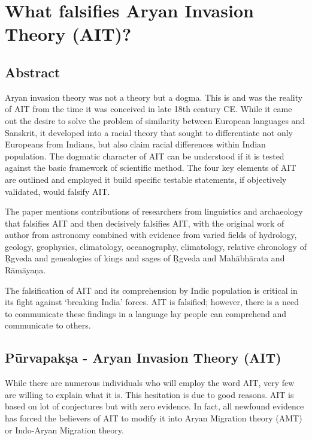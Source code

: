 
\chapter{What falsifies Aryan Invasion Theory (AIT)?}\label{chap08}



\section*{Abstract}

Aryan invasion theory was not a theory but a dogma. This is and was the reality of AIT from the time it was conceived in late 18th century CE. While it came out the desire to solve the problem of similarity between European languages and Sanskrit, it developed into a racial theory that sought to differentiate not only Europeans from Indians, but also claim racial differences within Indian population. The dogmatic character of AIT can be understood if it is tested against the basic framework of scientific method. The four key elements of AIT are outlined and employed it build specific testable statements, if objectively validated, would falsify AIT.

The paper mentions contributions of researchers from linguistics and archaeology that falsifies AIT and then decisively falsifies AIT, with the original work of author from astronomy combined with evidence from varied fields of hydrology, geology, geophysics, climatology, oceanography, climatology, relative chronology of Ṛgveda and genealogies of kings and sages of Ṛgveda and Mahābhārata and Rāmāyaņa.

The falsification of AIT and its comprehension by Indic population is critical in its fight against ‘breaking India’ forces. AIT is falsified; however, there is a need to communicate these findings in a language lay people can comprehend and communicate to others.


\section*{Pūrvapakṣa - Aryan Invasion Theory (AIT)}

While there are numerous individuals who will employ the word AIT, very few are willing to explain what it is. This hesitation is due to good reasons. AIT is based on lot of conjectures but with zero evidence. In fact, all newfound evidence has forced the believers of AIT to modify it into Aryan Migration theory (AMT) or Indo-Aryan Migration theory.

